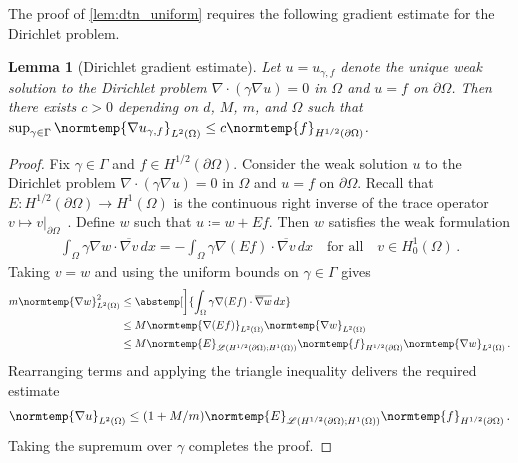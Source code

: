 \documentclass[pdflatex,sn-mathphys-num]{sn-jnl-preprint}
\newcommand{\sL}{\mathscr{L}}
\newcommand{\pOmega}{{\partial\Omega}}
\newcommand{\norm}{\normtemp}
\newcommand{\abs}{\abstemp}
\newcommand{\defeq}{\coloneqq} %
\newcommand{\diff}{d}
\newcommand{\dd}[1]{\,\diff{#1}}
\def\qfa{\quad\text{for all}\quad}
\theoremstyle{thmstyleone}%
\newtheorem{lemma}[theorem]{Lemma}%
\theoremstyle{thmstyletwo}%
\theoremstyle{thmstylethree}%
\numberwithin{equation}{section}
\numberwithin{theorem}{section}
\begin{document}
\begin{appendices}
The proof of \cref{lem:dtn_uniform} requires the following gradient estimate for the Dirichlet problem.
\begin{lemma}[Dirichlet gradient estimate]\label{lem:diri_grad_estimate}
    Let $u=u_{\gamma,f}$ denote the unique weak solution to the Dirichlet problem $\nabla\cdot(\gamma\nabla u)=0$ in $\Omega$ and $u=f$ on $\partial\Omega$. Then there exists $c>0$ depending on $d$, $M$, $m$, and $\Omega$ such that $\sup_{\gamma\in\Gamma}\norm{\nabla u_{\gamma,f}}_{L^2(\Omega)}\leq c \norm{f}_{H^{1/2}(\pOmega)}$.
\end{lemma}
\begin{proof}
    Fix $\gamma\in\Gamma$ and $f\in H^{1/2}(\pOmega)$. Consider the weak solution $u$ to the Dirichlet problem $\nabla\cdot(\gamma\nabla u)=0$ in $\Omega$ and $u=f$ on $\partial\Omega$. Recall that $E\colon H^{1/2}(\pOmega)\to H^1(\Omega)$ is the continuous right inverse of the trace operator $v\mapsto v|_{\partial\Omega}$~\cite[Thm.~8.3, p.~39]{lions2012non}. Define $w$ such that $u\defeq w+ Ef$. Then $w$ satisfies the weak formulation
    \begin{align*}
        \int_\Omega \gamma\nabla w\cdot\overline{\nabla v}\dd{x} = -\int_\Omega\gamma\nabla(Ef)\cdot\overline{\nabla v}\dd{x}\qfa v\in H^1_0(\Omega)\,.
    \end{align*}
    Taking $v=w$ and using the uniform bounds on $\gamma\in\Gamma$ gives
    \begin{align*}
        m\norm{\nabla w}_{L^2(\Omega)}^2&\leq \abs[\bigg]{\int_\Omega\gamma\nabla(Ef)\cdot\overline{\nabla w}\dd{x}}\\
        &\leq  M\norm{\nabla(Ef)}_{L^2(\Omega)}\norm{\nabla w}_{L^2(\Omega)}\\
        &\leq M\norm{E}_{\sL(H^{1/2}(\partial\Omega);H^1(\Omega))}\norm{f}_{H^{1/2}(\partial\Omega)}\norm{\nabla w}_{L^2(\Omega)}\,.
    \end{align*}
    Rearranging terms and applying the triangle inequality delivers the required estimate
    \begin{align*}
        \norm{\nabla u}_{L^2(\Omega)}\leq (1 + M/m)\norm{E}_{\sL(H^{1/2}(\partial\Omega);H^1(\Omega))}\norm{f}_{H^{1/2}(\partial\Omega)}\,.
    \end{align*}
    Taking the supremum over $\gamma$ completes the proof.
\end{proof}


\end{appendices}
\end{document}
